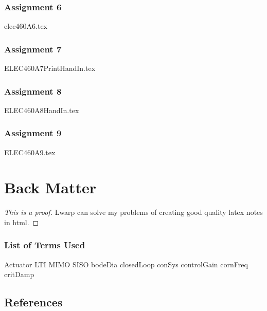 \documentclass{scrreprt}
\theoremstyle{plain}
\theoremstyle{definition}
\theoremstyle{remark}
\begin{document}
\section{Assignment 6}
{elec460A6.tex}

\section{Assignment 7}
{ELEC460A7PrintHandIn.tex}

\section{Assignment 8}
{ELEC460A8HandIn.tex}

\section{Assignment 9}
{ELEC460A9.tex}
\part{Back Matter}

\begin{proof}[This is a proof]
	Lwarp can solve my problems of creating good quality latex notes in html.
\end{proof}
\section*{List of Terms Used}
\gls{Actuator} \gls{LTI} \gls{MIMO} \gls{SISO} \gls{bodeDia} \gls{closedLoop} \gls{conSys} \gls{controlGain} \gls{cornFreq} \gls{critDamp} 


\chapter*{References}\label{references}
\end{document}
